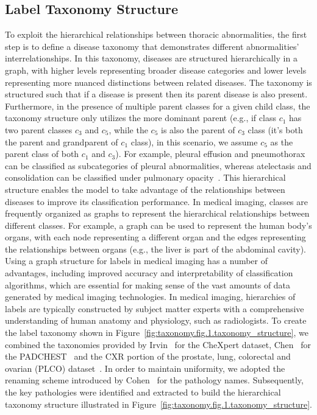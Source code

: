 \documentclass[authoryear,preprint,review,12pt]{elsarticle}
\begin{document}
\subsection{Label Taxonomy Structure}\label{subsec:label-taxonomy-and-hierarchy}
To exploit the hierarchical relationships between thoracic abnormalities, the first step is to define a disease taxonomy that demonstrates different abnormalities' interrelationships. In this taxonomy, diseases are structured hierarchically in a graph, with higher levels representing broader disease categories and lower levels representing more nuanced distinctions between related diseases. The taxonomy is structured such that if a disease is present then its parent disease is also present. Furthermore, in the presence of multiple parent classes for a given child class, the taxonomy structure only utilizes the more dominant parent (e.g., if class $c_1$ has two parent classes $c_3$ and $c_5$, while the $c_5$ is also the parent of $c_3$ class (it's both the parent and grandparent of $c_1$ class), in this scenario, we assume $c_5$ as the parent class of both $c_1$ and $c_3$).
%
For example, pleural effusion and pneumothorax can be classified as subcategories of pleural abnormalities, whereas atelectasis and consolidation can be classified under pulmonary opacity~\cite{irvin_CheXpert_2019}. This hierarchical structure enables the model to take advantage of the relationships between diseases to improve its classification performance.
In medical imaging, classes are frequently organized as graphs to represent the hierarchical relationships between different classes. For example, a graph can be used to represent the human body's organs, with each node representing a different organ and the edges representing the relationships between organs (e.g., the liver is part of the abdominal cavity). Using a graph structure for labels in medical imaging has a number of advantages, including improved accuracy and interpretability of classification algorithms, which are essential for making sense of the vast amounts of data generated by medical imaging technologies. In medical imaging, hierarchies of labels are typically constructed by subject matter experts with a comprehensive understanding of human anatomy and physiology, such as radiologists.
%
To create the label taxonomy shown in Figure~\ref{fig:taxonomy.fig.1.taxonomy_structure}, we combined the taxonomies provided by Irvin~\cite{irvin_CheXpert_2019} for the CheXpert dataset, Chen~\cite{chen_Deep_2020} for the PADCHEST~\cite{bustos_Padchest_2020} and the CXR portion of the prostate, lung, colorectal and ovarian (PLCO) dataset~\cite{gohagan_Prostate_2000}.
In order to maintain uniformity, we adopted the renaming scheme introduced by Cohen~\cite{cohen_TorchXRayVision_2022} for the pathology names. Subsequently, the key pathologies were identified and extracted to build the hierarchical taxonomy structure illustrated in Figure~\ref{fig:taxonomy.fig.1.taxonomy_structure}.
%
\end{document}
